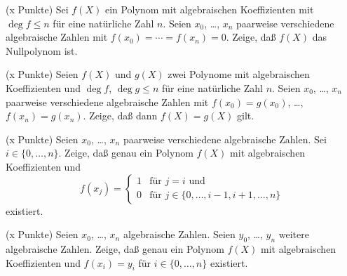 \documentclass{algsheet}
\author{Dipl.-Math.~Arturo Mancino}
\date{17.~November 2010}
\begin{document}
                \maketitle



\begin{exercise}(x Punkte)\newline
    Sei \(f(X)\) ein Polynom mit algebraischen Koeffizienten mit \(\deg f \leq n\)
    für eine natürliche Zahl \(n\). Seien \(x_0\), \dots, \(x_n\) paarweise verschiedene algebraische Zahlen
    mit \(f(x_0) = \dotsb = f(x_n) = 0\). Zeige, daß \(f(X)\) das Nullpolynom ist.
\end{exercise}

\begin{exercise}(x Punkte)\newline
    Seien \(f(X)\) und \(g(X)\) zwei Polynome mit algebraischen Koeffizienten und
    \(\deg f\), \(\deg g \leq n\) für eine natürliche Zahl \(n\). Seien \(x_0\), \dots,
    \(x_n\) paarweise verschiedene algebraische Zahlen mit \(f(x_0) = g(x_0)\), \dots, \(f(x_n) = g(x_n)\). Zeige, 
    daß dann \(f(X) = g(X)\) gilt.
\end{exercise}

\begin{exercise}(x Punkte)\newline
    Seien \(x_0\), \dots, \(x_n\) paarweise verschiedene algebraische Zahlen. Sei
    \(i \in \{0, \dots, n\}\). Zeige, daß genau ein Polynom \(f(X)\) mit algebraischen
    Koeffizienten und
    \[
        f(x_j) = \begin{cases} 1 & \text{für \(j = i\) und}\\ 0
                                 & \text{für \(j \in \{0, \dotsc, i - 1, i + 1, \dotsc, n\}\)} \end{cases}
    \]
    existiert.
\end{exercise}

\begin{exercise}(x Punkte)\newline
    Seien \(x_0\), \dots, \(x_n\) algebraische Zahlen. Seien \(y_0\),
    \dots, \(y_n\) weitere algebraische Zahlen. Zeige, daß genau ein Polynom \(f(X)\) mit algebraischen
    Koeffizienten und \(f(x_i) = y_i\) für \(i \in \{0, \dots, n\}\) existiert.
\end{exercise}
\end{document}
